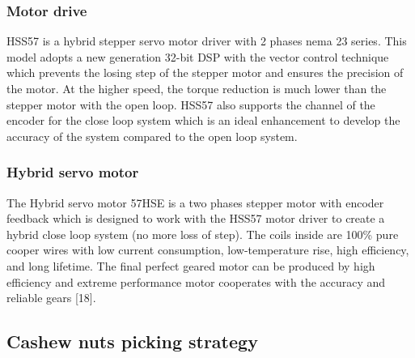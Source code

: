 \documentclass[10pt, letterpaper]{article}
\begin{document}
\subsubsection*{Motor drive}
    HSS57 is a hybrid stepper servo motor driver with 2 phases nema 23 series. This model adopts a new generation 32-bit DSP with the vector control technique which prevents the losing step of the stepper motor and ensures the precision of the motor. At the higher speed, the torque reduction is much lower than the stepper motor with the open loop. HSS57 also supports the channel of the encoder for the close loop system which is an ideal enhancement to develop the accuracy of the system compared to the open loop system.\par

\subsubsection*{Hybrid servo motor}
    The Hybrid servo motor 57HSE is a two phases stepper motor with encoder feedback which is designed to work with the HSS57 motor driver to create a hybrid close loop system (no more loss of step). The coils inside are 100\% pure cooper wires with low current consumption, low-temperature rise, high efficiency, and long lifetime. The final perfect geared motor can be produced by high efficiency and extreme performance motor cooperates with the accuracy and reliable gears [18].\par

\subsection{Cashew nuts picking strategy}
\end{document}
